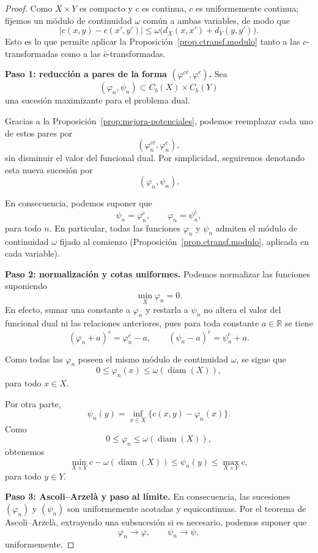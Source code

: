 \documentclass[12pt, a4paper]{amsbook}
\newcommand{\R}{{\mathbb R}}
\theoremstyle{remark}
\theoremstyle{definition}
\numberwithin{section}{chapter}
\numberwithin{subsection}{section}
\numberwithin{equation}{section}
\numberwithin{figure}{chapter}
\begin{document}
\begin{proof}
Como $X\times Y$ es compacto y $c$ es continua, $c$ es uniformemente
continua; fijemos un módulo de continuidad $\omega$ común a ambas variables,
de modo que
\[
|c(x,y)-c(x',y')|\le\omega\bigl(d_X(x,x')+d_Y(y,y')\bigr).
\]
Esto es lo que permite aplicar la Proposición~\ref{prop.ctransf.modulo} tanto
a las $c$-transformadas como a las $\bar c$-transformadas.

\medskip\noindent\textbf{Paso 1: reducción a pares de la forma
$(\varphi^{c\bar c},\varphi^c)$.}
Sea
\[
(\varphi_n,\psi_n)\subset C_b(X)\times C_b(Y)
\]
una sucesión maximizante para el problema dual.

Gracias a la Proposición~\ref{prop:mejora-potenciales}, podemos reemplazar
cada uno de estos pares por
\[
(\varphi_n^{c\bar c},\varphi_n^c),
\]
sin disminuir el valor del funcional dual. Por simplicidad, seguiremos
denotando esta nueva sucesión por
\[
(\varphi_n,\psi_n).
\]

En consecuencia, podemos suponer que
\[
\psi_n=\varphi_n^c,
\qquad
\varphi_n=\psi_n^{\bar c},
\]
para todo \(n\). En particular, todas las funciones
\(\varphi_n\) y \(\psi_n\) admiten el módulo de continuidad $\omega$ fijado al
comienzo (Proposición~\ref{prop.ctransf.modulo}, aplicada en cada variable).

\medskip\noindent\textbf{Paso 2: normalización y cotas uniformes.}
Podemos normalizar las funciones suponiendo
\[
\min_X\varphi_n=0.
\]
En efecto, sumar una constante a $\varphi_n$ y restarla a $\psi_n$ no altera
el valor del funcional dual ni las relaciones anteriores, pues para toda
constante $a\in\R$ se tiene
\[
(\varphi_n+a)^c=\varphi_n^c-a,
\qquad
(\psi_n-a)^{\bar c}=\psi_n^{\bar c}+a.
\]

Como todas las $\varphi_n$ poseen el mismo módulo de continuidad
$\omega$, se sigue que
\[
0
\le
\varphi_n(x)
\leq
\omega(\operatorname{diam}(X)),
\]
para todo $x\in X$.

Por otra parte,
\[
\psi_n(y)
=
\inf_{x\in X}
\{c(x,y)-\varphi_n(x)\}.
\]
Como
\[
0\leq\varphi_n\leq\omega(\operatorname{diam}(X)),
\]
obtenemos
\[
\min_{X\times Y}c
-
\omega(\operatorname{diam}(X))
\leq
\psi_n(y)
\leq
\max_{X\times Y}c,
\]
para todo $y\in Y$.

\medskip\noindent\textbf{Paso 3: Ascoli--Arzelà y paso al límite.}
En consecuencia, las sucesiones
$(\varphi_n)$ y $(\psi_n)$
son uniformemente acotadas y equicontinuas. Por el teorema de
Ascoli--Arzelà, extrayendo una subsucesión si es necesario, podemos suponer
que
\[
\varphi_n\longrightarrow\varphi,
\qquad
\psi_n\longrightarrow\psi,
\]
uniformemente.


\end{proof}
\end{document}
